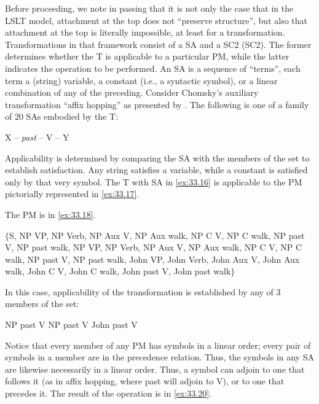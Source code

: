 \documentclass[output=paper]{langsci/langscibook}
\begin{document}
Before proceeding, we note in passing that it is not only the case that in the
LSLT model, attachment at the top does not ``preserve
structure'', but also that attachment at the top is literally impossible, at
least for a transformation.  Transformations in that framework consist of a
\gls{SA} and a \gls{SC2} (\glsdesc{SC2}). The former determines whether the T
is applicable to a particular \gls{PM}, while the latter
indicates the operation to be performed.  An \gls{SA} is a sequence of
``terms'', each term a (string) variable, a constant (i.e., a syntactic
symbol), or a linear combination of any of the preceding.  Consider Chomsky's
auxiliary transformation ``affix hopping'' as presented by
\textcite{Chomsky1957}. The following is one of a family of 20 \glspl{SA}
embodied by the T:\largerpage[2]

\ea\label{ex:33.16}X -- \emph{past} -- V -- Y
\z

Applicability is determined by comparing the \gls{SA} with the members of the
set to establish satisfaction. Any string satisfies a variable, while a
constant is satisfied only by that very symbol. The T with \gls{SA} in
\eqref{ex:33.16} is applicable to the \gls{PM} pictorially represented in
\eqref{ex:33.17}.

\ea\label{ex:33.17}
\z

\noindent The \gls{PM} is in \eqref{ex:33.18}.

\ea\small\label{ex:33.18}$\{$S, NP VP, NP Verb, NP Aux V, NP Aux walk, NP C V, NP C walk, NP past V, NP past walk, NP VP, NP Verb, NP Aux V, NP Aux walk, NP C V, NP C walk, NP past V, NP past walk, John VP, John Verb, John Aux V, John Aux walk, John C V, John C walk, John past V, John past walk$\}$
\z

In this case, applicability of the transformation is established by any of 3
members of the set:

\ea\label{ex:33.19}NP past V\hspace{5mm} NP past V\hspace{5mm} John past V
\z

Notice that every member of any \gls{PM} has symbols in a linear order; every
pair of symbols in a member are in the precedence relation. Thus, the symbols
in any \gls{SA} are likewise necessarily in a linear order. Thus, a symbol can
adjoin to one that follows it (as in affix hopping, where past will adjoin to
V), or to one that precedes it. The result of the operation is in
\eqref{ex:33.20}.\largerpage[2]
\end{document}
